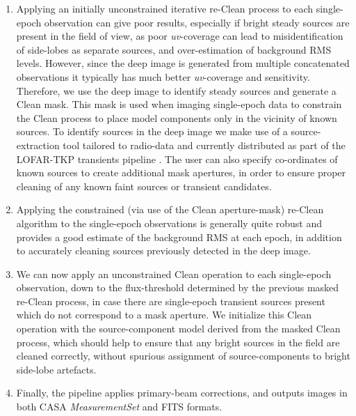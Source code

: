 \documentclass[5p,authoryear]{elsarticle}
\begin{document}
\begin{enumerate}[I]
 \item Applying an initially unconstrained iterative re-Clean process to each single-epoch observation can give poor results, especially if bright steady sources are present in the field of view, as poor \textit{uv}-coverage can lead to misidentification of side-lobes as separate sources,  and over-estimation of background RMS levels. 
 However, since the deep image is generated from multiple concatenated observations it typically has much better \textit{uv}-coverage and sensitivity. Therefore, we use the deep image to identify steady sources and generate a Clean mask. 
 This mask is used when imaging single-epoch data to constrain the Clean process to place model components only in the vicinity of known sources. 
 To identify sources in the deep image we make use of a source-extraction tool tailored to radio-data and currently distributed as part of the LOFAR-TKP transients pipeline \citep{Trap2014,Swinbank2015}.
 The user can also specify co-ordinates of known sources to create additional mask apertures, in order to ensure proper cleaning of any known faint sources or transient candidates. 
 
 \item  Applying the constrained (via use of the Clean aperture-mask) re-Clean algorithm to the single-epoch observations is generally quite robust and provides a good estimate of the background RMS at each epoch, in addition to accurately cleaning sources previously detected in the deep image.
 
 \item We can now apply an unconstrained Clean operation to each single-epoch observation, down to the flux-threshold determined by the previous masked re-Clean process, in case there are single-epoch transient sources present which do not correspond to a mask aperture. 
 We initialize this Clean operation with the source-component model derived from the masked Clean process, which should help to ensure that any bright sources in the field are cleaned correctly, without spurious assignment of source-components to bright side-lobe artefacts.
 
 \item Finally, the pipeline applies primary-beam corrections, and outputs images in both CASA \textit{MeasurementSet} and FITS formats.
\end{enumerate}
\end{document}
